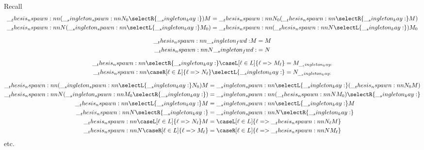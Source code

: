 Recall 
\begin{gather*}
  \begin{aligned}
    \nspawn{(\spawn{N_0}{\selectR{\kay}})}{M}
      &= \nspawn{N_0}{(\nspawn{\selectR{\kay}}{M})}
    \\
    \nspawn{N}{(\spawn{\selectL{\kay}}{M_0})}
      &= \nspawn{(\nspawn{N}{\selectL{\kay}})}{M_0}
  \end{aligned}
  \\[2\jot]
  \begin{aligned}
    \nspawn{\fwd}{M}
      &= M
    \\
    \nspawn{N}{\fwd}
      &= N
  \end{aligned}
  \\[2\jot]
  \begin{aligned}
    \nspawn{\selectR{\kay}}{\caseL[\ell \in L]{\ell => M_{\ell}}}
      &= M_{\kay}
    \\
    \nspawn{\caseR[\ell \in L]{\ell => N_{\ell}}}{\selectL{\kay}}
      &= N_{\kay}
  \end{aligned}
  \\[2\jot]
  \begin{aligned}
    \nspawn{(\spawn{\selectL{\kay}}{N_0})}{M}
      &= \spawn{\selectL{\kay}}{(\nspawn{N_0}{M})}
    \\
    \nspawn{N}{(\spawn{M_0}{\selectR{\kay}})}
      &= \spawn{(\nspawn{N}{M_0})}{\selectR{\kay}}
    \\
    \nspawn{\selectL{\kay}}{M}
      &= \spawn{\selectL{\kay}}{M}
    \\
    \nspawn{N}{\selectR{\kay}}
      &= \spawn{N}{\selectR{\kay}}
    \\
    \nspawn{\caseL[\ell \in L]{\ell => N_{\ell}}}{M}
      &= \caseL[\ell \in L]{\ell => \nspawn{N_{\ell}}{M}}
    \\
    \nspawn{N}{\caseR[\ell \in L]{\ell => M_{\ell}}}
      &= \caseR[\ell \in L]{\ell => \nspawn{N}{M_{\ell}}}
  \end{aligned}
\end{gather*}
etc.

